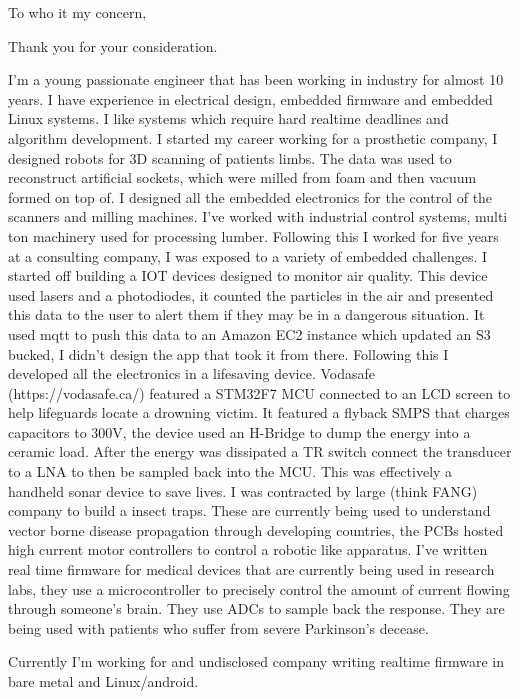 \documentclass[11pt,a4paper,roman]{moderncv}
\begin{document}
\date{\today}
\opening{To who it my concern,}
\closing{Thank you for your consideration.}
\makelettertitle

I'm a young passionate engineer that has been working in industry for almost 10 years. I have experience in electrical design, embedded firmware and embedded Linux systems. I like systems which require hard realtime deadlines and algorithm development. I started my career working for a prosthetic company, I designed robots for 3D scanning of patients limbs. The data was used to reconstruct artificial sockets, which were milled from foam and then vacuum formed on top of. I designed all the embedded electronics for the control of the scanners and milling machines. I've worked with industrial control systems, multi ton machinery used for processing lumber. Following this I worked for five years at a consulting company, I was exposed to a variety of embedded challenges. I started off building a IOT devices designed to monitor air quality. This device used lasers and a photodiodes, it counted the particles in the air and presented this data to the user to alert them if they may be in a dangerous situation. It used mqtt to push this data to an Amazon EC2 instance which updated an S3 bucked, I didn't design the app that took it from there. Following this I developed all the electronics in a lifesaving device. Vodasafe (https://vodasafe.ca/) featured a STM32F7 MCU connected to an LCD screen to help lifeguards locate a drowning victim. It featured a flyback SMPS that charges capacitors to 300V, the device used an H-Bridge to dump the energy into a ceramic load. After the energy was dissipated a TR switch connect the transducer to a LNA to then be sampled back into the MCU. This was effectively a handheld sonar device to save lives. I was contracted by large (think FANG) company to build a insect traps. These are currently being used to understand vector borne disease propagation through developing countries, the PCBs hosted high current motor controllers to control a robotic like apparatus. I've written real time firmware for medical devices that are currently being used in research labs, they use a microcontroller to precisely control the amount of current flowing through someone's brain. They use ADCs to sample back the response. They are  being used with patients who suffer from severe Parkinson's decease. 

Currently I'm working for and undisclosed company writing realtime firmware in bare metal and Linux/android.
\end{document}

